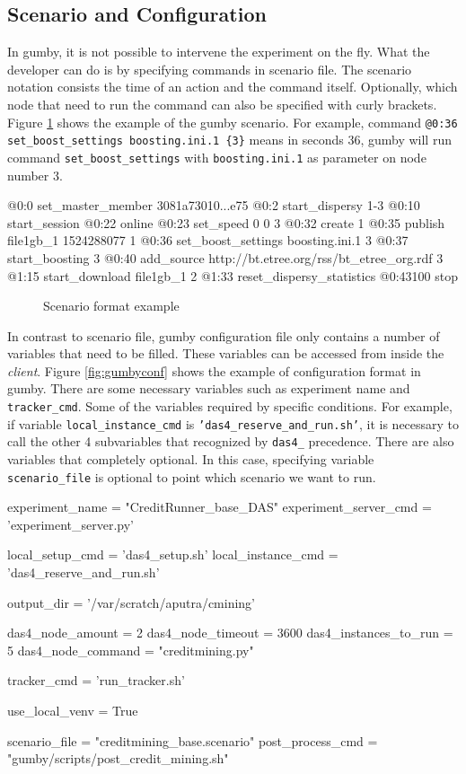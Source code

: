 \subsection{Scenario and Configuration}
In gumby, it is not possible to intervene the experiment on the fly. What the developer can do is by specifying commands in scenario file. The scenario notation consists the time of an action and the command itself. Optionally, which node that need to run the command can also be specified with curly brackets. Figure \ref{fig:gumbyscenario} shows the example of the gumby scenario. For example, command \texttt{@0:36 set\_boost\_settings boosting.ini.1 \{3\}} means in seconds 36, gumby will run command \texttt{set\_boost\_settings} with \texttt{boosting.ini.1} as parameter on node number 3. 

\begin{verbbox}
@0:0 set_master_member 3081a73010...e75
@0:2 start_dispersy {1-3}
@0:10 start_session
@0:22 online
@0:23 set_speed 0 0 {3}
@0:32 create {1}
@0:35 publish file1gb_1 1524288077 {1}
@0:36 set_boost_settings boosting.ini.1 {3}
@0:37 start_boosting {3}
@0:40 add_source http://bt.etree.org/rss/bt_etree_org.rdf {3}
@1:15 start_download file1gb_1 {2}
@1:33 reset_dispersy_statistics
@0:43100 stop
\end{verbbox}

\begin{figure}[h]
	\fbox{\theverbbox}
	\caption{Scenario format example}
	\label{fig:gumbyscenario}
\end{figure}

In contrast to scenario file, gumby configuration file only contains a number of variables that need to be filled. These variables can be accessed from inside the \textit{client}. Figure \ref{fig:gumbyconf} shows the example of configuration format in gumby. There are some necessary variables such as experiment name and \texttt{tracker\_cmd}. Some of the variables required by specific conditions. For example, if variable \texttt{local\_instance\_cmd} is \texttt{'das4\_reserve\_and\_run.sh'}, it is necessary to call the other 4 subvariables that recognized by \texttt{das4\_} precedence. There are also variables that completely optional. In this case, specifying variable \texttt{scenario\_file} is optional to point which scenario we want to run.

\begin{verbbox}
experiment_name = "CreditRunner_base_DAS"
experiment_server_cmd = 'experiment_server.py'

local_setup_cmd = 'das4_setup.sh'
local_instance_cmd = 'das4_reserve_and_run.sh'

output_dir = '/var/scratch/aputra/cmining'

das4_node_amount = 2
das4_node_timeout = 3600
das4_instances_to_run = 5
das4_node_command = "creditmining.py"

tracker_cmd = 'run_tracker.sh'

use_local_venv = True

scenario_file = "creditmining_base.scenario"
post_process_cmd = "gumby/scripts/post_credit_mining.sh"
\end{verbbox}

